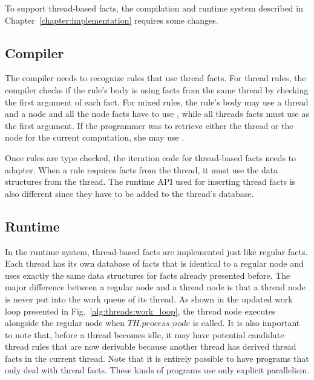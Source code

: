 To support thread-based facts, the compilation and runtime system described in
Chapter~\ref{chapter:implementation} requires some changes.

\subsection{Compiler}

The compiler needs to recognize rules that use thread facts. For thread rules,
the compiler checks if the rule's body is using facts from the same thread by
checking the first argument of each fact. For mixed rules, the rule's body may
use a thread  and a node  and all the node facts have to use
, while all threads facts must use  as the first argument. If
the programmer was to retrieve either the thread or the node for the current
computation, she may use .

Once rules are type checked, the iteration code for thread-based facts needs to
adapter. When a rule requires facts from the thread, it must use the data
structures from the thread. The runtime API used for inserting thread facts is
also different since they have to be added to the thread's database.

\subsection{Runtime}

In the runtime system, thread-based facts are implemented just like regular
facts. Each thread has its own database of facts that is identical to a regular
node and uses exactly the same data structures for facts already presented
before. The major difference between a regular node and a thread node is that a
thread node is never put into the work queue of its thread. As shown in the
updated work loop presented in Fig.~\ref{alg:threads:work_loop}, the thread node
executes alongside the regular node when $TH.process\_node$ is called. It is
also important to note that, before a thread becomes idle, it may have potential
candidate thread rules that are now derivable because another thread has derived
thread facts in the current thread. Note that it is entirely possible to have
programs that only deal with thread facts. These kinds of programs use only
explicit parallelism.


